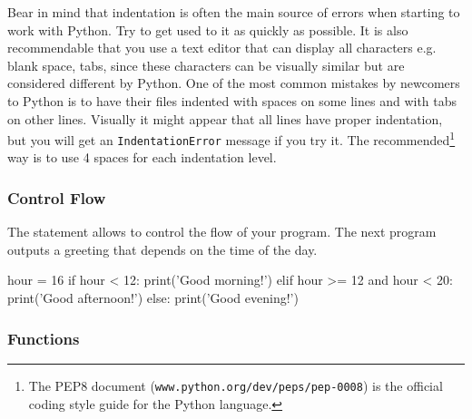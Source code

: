 \noindent Bear in mind that indentation is often the main source of errors when starting to work with Python. Try to get used to it as quickly as possible. It is also recommendable that you use a text editor that can display all characters e.g. blank space, tabs, since these characters can be visually similar but are considered different by Python. One of the most common mistakes by newcomers to Python is to have their files indented with spaces on some lines and with tabs on other lines. Visually it might appear that all lines have proper indentation, but you will get an \texttt{IndentationError} message if you try it. The recommended\footnote{The PEP8 document (\texttt{www.python.org/dev/peps/pep-0008}) is the official coding style guide for the Python language.} way is to use 4 spaces for each indentation level.



\subsubsection{Control Flow}

The  statement allows to control the flow of your program. The next program outputs a greeting that depends on the time of the day.

\begin{python}
hour = 16
if hour < 12:
    print('Good morning!')
elif hour >= 12 and hour < 20:
    print('Good afternoon!')
else:
    print('Good evening!')
\end{python}

 
\subsubsection{Functions}

